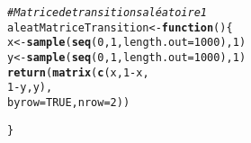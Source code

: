 \documentclass{article}
\makeatletter
\newcommand{\hlnum}[1]{\textcolor[rgb]{0.686,0.059,0.569}{#1}}%
\newcommand{\hlcom}[1]{\textcolor[rgb]{0.678,0.584,0.686}{\textit{#1}}}%
\newcommand{\hlopt}[1]{\textcolor[rgb]{0,0,0}{#1}}%
\newcommand{\hlstd}[1]{\textcolor[rgb]{0.345,0.345,0.345}{#1}}%
\newcommand{\hlkwa}[1]{\textcolor[rgb]{0.161,0.373,0.58}{\textbf{#1}}}%
\newcommand{\hlkwb}[1]{\textcolor[rgb]{0.69,0.353,0.396}{#1}}%
\newcommand{\hlkwc}[1]{\textcolor[rgb]{0.333,0.667,0.333}{#1}}%
\newcommand{\hlkwd}[1]{\textcolor[rgb]{0.737,0.353,0.396}{\textbf{#1}}}%
\newenvironment{kframe}{%
 \def\at@end@of@kframe{}%
 \ifinner\ifhmode%
  \def\at@end@of@kframe{\end{minipage}}%
  \begin{minipage}{\columnwidth}%
 \fi\fi%
 \def\FrameCommand##1{\hskip\@totalleftmargin \hskip-\fboxsep
 \colorbox{shadecolor}{##1}\hskip-\fboxsep
     \hskip-\linewidth \hskip-\@totalleftmargin \hskip\columnwidth}%
 \MakeFramed {\advance\hsize-\width
   \@totalleftmargin\z@ \linewidth\hsize
   \@setminipage}}%
 {\par\unskip\endMakeFramed%
 \at@end@of@kframe}
\newenvironment{knitrout}{}{} %
\makeatother
\begin{document}
\begin{knitrout}
\color{fgcolor}\begin{kframe}
\begin{alltt}
\hlcom{# Matrice de transitions aléatoire 1}
\hlstd{aleatMatriceTransition}\hlkwb{<-}\hlkwa{function}\hlstd{()\{}
  \hlstd{x}\hlkwb{<-}\hlkwd{sample}\hlstd{(}\hlkwd{seq}\hlstd{(}\hlnum{0}\hlstd{,}\hlnum{1}\hlstd{,}\hlkwc{length.out} \hlstd{=} \hlnum{1000}\hlstd{),} \hlnum{1}\hlstd{)}
  \hlstd{y}\hlkwb{<-}\hlkwd{sample}\hlstd{(}\hlkwd{seq}\hlstd{(}\hlnum{0}\hlstd{,}\hlnum{1}\hlstd{,}\hlkwc{length.out} \hlstd{=} \hlnum{1000}\hlstd{),} \hlnum{1}\hlstd{)}
  \hlkwd{return}\hlstd{(}\hlkwd{matrix}\hlstd{(}\hlkwd{c}\hlstd{(x,}\hlnum{1}\hlopt{-}\hlstd{x,}
                  \hlnum{1}\hlopt{-}\hlstd{y,y),}
                \hlkwc{byrow}\hlstd{=}\hlnum{TRUE}\hlstd{,}\hlkwc{nrow}\hlstd{=}\hlnum{2}\hlstd{))}

\hlstd{\}}


\end{alltt}
\end{kframe}
\end{knitrout}
\end{document}
